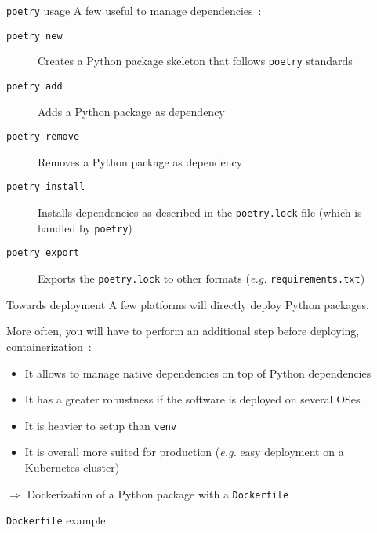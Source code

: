 \begin{frame}{\texttt{poetry} usage}
  A few useful  to manage dependencies~:
  \begin{description}
    \item[\texttt{poetry new}] Creates a Python package skeleton that follows \texttt{poetry} standards
    \item[\texttt{poetry add}] Adds a Python package as dependency
    \item[\texttt{poetry remove}] Removes a Python package as dependency
    \item[\texttt{poetry install}] Installs dependencies as described in the \texttt{poetry.lock} file (which is handled by \texttt{poetry})
    \item[\texttt{poetry export}] Exports the \texttt{poetry.lock} to other formats (\textit{e.g.} \texttt{requirements.txt})
  \end{description}
\end{frame}

\begin{frame}{Towards deployment}
  A few platforms will directly deploy Python packages.

  More often, you will have to perform an additional step before deploying, containerization~:

  \begin{itemize}
    \item It allows to manage native dependencies on top of Python dependencies
    \item It has a greater robustness if the software is deployed on several OSes
    \item It is heavier to setup than \texttt{venv}
    \item It is overall more suited for production (\textit{e.g.} easy deployment on a Kubernetes cluster)
  \end{itemize}

  $\Rightarrow$ Dockerization of a Python package with a \texttt{Dockerfile}
\end{frame}

\begin{frame}{\texttt{Dockerfile} example}
\end{frame}
